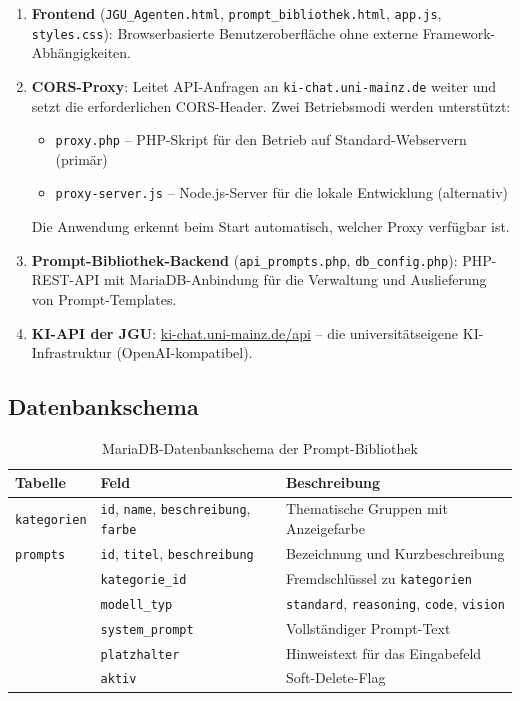 \documentclass[12pt, a4paper]{article}
\begin{document}
\begin{enumerate}[leftmargin=1.5cm]
  \item \textbf{Frontend} (\texttt{JGU\_Agenten.html}, \texttt{prompt\_bibliothek.html}, \texttt{app.js}, \texttt{styles.css}): Browserbasierte Benutzeroberfläche ohne externe Framework-Abhängigkeiten.
  \item \textbf{CORS-Proxy}: Leitet API-Anfragen an \texttt{ki-chat.uni-mainz.de} weiter und setzt die erforderlichen CORS-Header. Zwei Betriebsmodi werden unterstützt:
    \begin{itemize}
      \item \texttt{proxy.php} -- PHP-Skript für den Betrieb auf Standard-Webservern (primär)
      \item \texttt{proxy-server.js} -- Node.js-Server für die lokale Entwicklung (alternativ)
    \end{itemize}
    Die Anwendung erkennt beim Start automatisch, welcher Proxy verfügbar ist.
  \item \textbf{Prompt-Bibliothek-Backend} (\texttt{api\_prompts.php}, \texttt{db\_config.php}): PHP-REST-API mit MariaDB-Anbindung für die Verwaltung und Auslieferung von Prompt-Templates.
  \item \textbf{KI-API der JGU}: \href{https://ki-chat.uni-mainz.de/api}{ki-chat.uni-mainz.de/api} -- die universitätseigene KI-Infrastruktur (OpenAI-kompatibel).
\end{enumerate}

\subsection{Datenbankschema}

\begin{table}[h]
  \centering
  \begin{tabular}{llp{7cm}}
    \toprule
    \textbf{Tabelle} & \textbf{Feld} & \textbf{Beschreibung} \\
    \midrule
    \texttt{kategorien} & \texttt{id}, \texttt{name}, \texttt{beschreibung}, \texttt{farbe} & Thematische Gruppen mit Anzeigefarbe \\
    \addlinespace
    \texttt{prompts} & \texttt{id}, \texttt{titel}, \texttt{beschreibung} & Bezeichnung und Kurzbeschreibung \\
                     & \texttt{kategorie\_id} & Fremdschlüssel zu \texttt{kategorien} \\
                     & \texttt{modell\_typ} & \texttt{standard}, \texttt{reasoning}, \texttt{code}, \texttt{vision} \\
                     & \texttt{system\_prompt} & Vollständiger Prompt-Text \\
                     & \texttt{platzhalter} & Hinweistext für das Eingabefeld \\
                     & \texttt{aktiv} & Soft-Delete-Flag \\
    \bottomrule
  \end{tabular}
  \caption{MariaDB-Datenbankschema der Prompt-Bibliothek}
\end{table}
\end{document}
